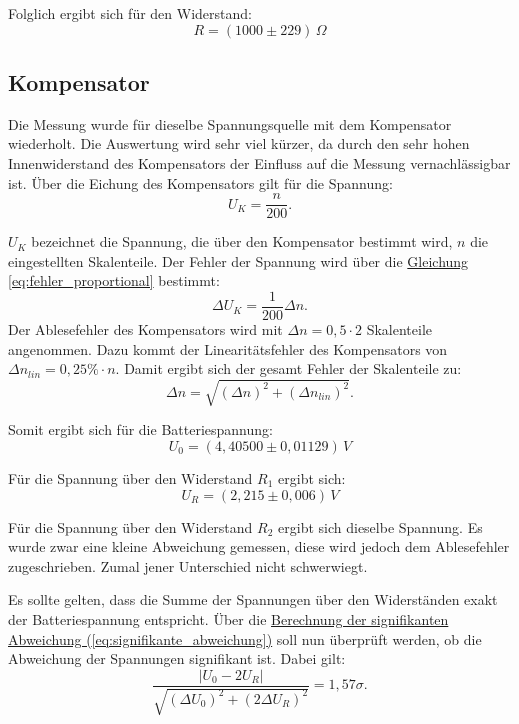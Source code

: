 Folglich ergibt sich für den Widerstand:
\begin{equation}
    \boxed{
        R = (1000 \pm 229) \, \Omega
    }
\end{equation}


\subsection*{Kompensator}
Die Messung wurde für dieselbe Spannungsquelle mit dem Kompensator wiederholt. Die Auswertung wird sehr viel kürzer, da durch den sehr hohen Innenwiderstand des Kompensators der Einfluss auf die Messung vernachlässigbar ist. Über die Eichung des Kompensators gilt für die Spannung:
\begin{equation}
    U_{K} = \frac{n}{200}.
    \label{eq:spannung_kompensator}
\end{equation}

$U_K$ bezeichnet die Spannung, die über den Kompensator bestimmt wird, $n$ die eingestellten Skalenteile. Der Fehler der Spannung wird über die \hyperref[eq:fehler_proportional]{Gleichung \ref*{eq:fehler_proportional}} bestimmt:
\begin{equation}
    \Delta U_K = \frac{1}{200} \Delta n.
\end{equation}
Der Ablesefehler des Kompensators wird mit $\Delta n = 0,5 \cdot 2$ Skalenteile angenommen. Dazu kommt der Linearitätsfehler des Kompensators von $\Delta n_{lin} = 0,25\% \cdot n$. Damit ergibt sich der gesamt Fehler der Skalenteile zu:
\begin{equation}
    \Delta n = \sqrt{(\Delta n)^2 + (\Delta n_{lin})^2}.
\end{equation}

Somit ergibt sich für die Batteriespannung:
\begin{equation}
    \boxed{
        U_0 = (4,40500 \pm 0,01129) \, V
    }
\end{equation}

Für die Spannung über den Widerstand $R_1$ ergibt sich:
\begin{equation}
    \boxed{
        U_{R} = (2,215 \pm 0,006) \, V
    }
\end{equation}

Für die Spannung über den Widerstand $R_2$ ergibt sich dieselbe Spannung. Es wurde zwar eine kleine Abweichung gemessen, diese wird jedoch dem Ablesefehler zugeschrieben. Zumal jener Unterschied nicht schwerwiegt.

Es sollte gelten, dass die Summe der Spannungen über den Widerständen exakt der Batteriespannung entspricht. Über die \hyperref[eq:signifikante_abweichung]{Berechnung der signifikanten Abweichung (\ref*{eq:signifikante_abweichung})} soll nun überprüft werden, ob die Abweichung der Spannungen signifikant ist. Dabei gilt:
\begin{equation}
    \frac{|U_0 - 2U_R|}{\sqrt{(\Delta U_0)^2 + (2 \Delta U_R)^2}} = 1,57\sigma.
\end{equation}

